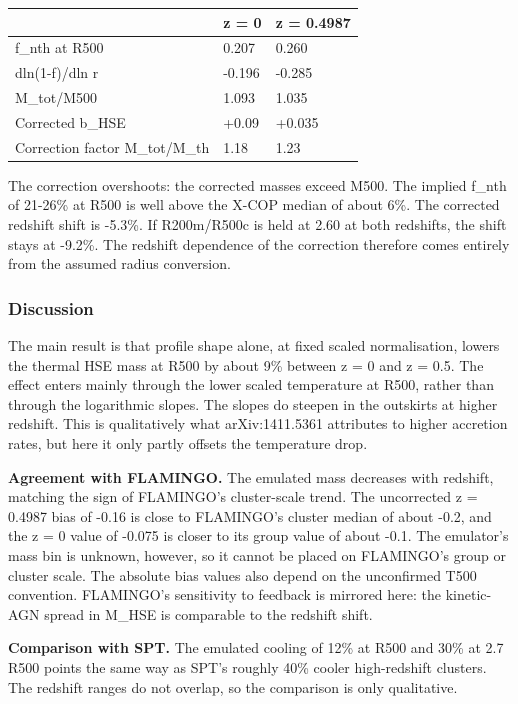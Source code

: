 \documentclass[11pt,a4paper]{article}
\begin{document}
\begin{longtable}{@{}p{}p{}p{}@{}}
\toprule
\textbf{} & \textbf{z = 0} & \textbf{z = 0.4987} \\ \midrule \endhead
f\_nth at R500 & 0.207 & 0.260 \\
dln(1-f)/dln r & -0.196 & -0.285 \\
M\_tot/M500 & 1.093 & 1.035 \\
Corrected b\_HSE & +0.09 & +0.035 \\
Correction factor M\_tot/M\_th & 1.18 & 1.23 \\
\bottomrule\end{longtable}
The correction overshoots: the corrected masses exceed M500. The implied f\_nth of 21-26\% at R500 is well above the X-COP median of about 6\%. The corrected redshift shift is -5.3\%. If R200m/R500c is held at 2.60 at both redshifts, the shift stays at -9.2\%. The redshift dependence of the correction therefore comes entirely from the assumed radius conversion.

\subsubsection*{Discussion}
The main result is that profile shape alone, at fixed scaled normalisation, lowers the thermal HSE mass at R500 by about 9\% between z = 0 and z = 0.5. The effect enters mainly through the lower scaled temperature at R500, rather than through the logarithmic slopes. The slopes do steepen in the outskirts at higher redshift. This is qualitatively what arXiv:1411.5361 attributes to higher accretion rates, but here it only partly offsets the temperature drop.

\textbf{Agreement with FLAMINGO.} The emulated mass decreases with redshift, matching the sign of FLAMINGO's cluster-scale trend. The uncorrected z = 0.4987 bias of -0.16 is close to FLAMINGO's cluster median of about -0.2, and the z = 0 value of -0.075 is closer to its group value of about -0.1. The emulator's mass bin is unknown, however, so it cannot be placed on FLAMINGO's group or cluster scale. The absolute bias values also depend on the unconfirmed T500 convention. FLAMINGO's sensitivity to feedback is mirrored here: the kinetic-AGN spread in M\_HSE is comparable to the redshift shift.

\textbf{Comparison with SPT.} The emulated cooling of 12\% at R500 and 30\% at 2.7 R500 points the same way as SPT's roughly 40\% cooler high-redshift clusters. The redshift ranges do not overlap, so the comparison is only qualitative.
\end{document}
